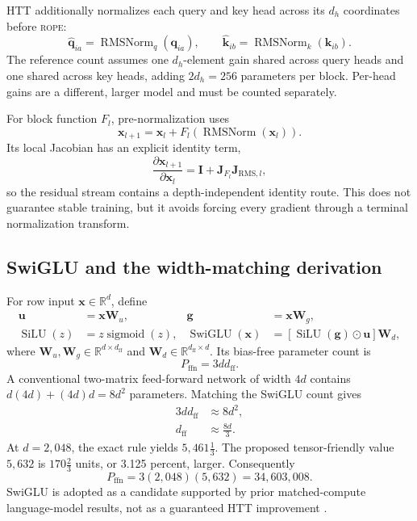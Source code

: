 \documentclass[10pt,letterpaper]{article}
\newcommand{\abbr}[1]{\textsc{\MakeLowercase{#1}}}
\newcommand{\R}{\mathbb{R}}
\newcommand{\1}{\mathbb{1}}
\newcommand{\vect}[1]{\bm{#1}}
\newcommand{\mat}[1]{\bm{#1}}
\newcommand{\sigmoid}{\operatorname{sigmoid}}
\begin{document}
HTT additionally normalizes each query and key head across its $d_h$ coordinates before \abbr{RoPE}:
\begin{equation}
  \widehat{\vect q}_{ia}=\operatorname{RMSNorm}_{q}(\vect q_{ia}),\qquad
  \widehat{\vect k}_{ib}=\operatorname{RMSNorm}_{k}(\vect k_{ib}).
  \label{eq:qknorm}
\end{equation}
The reference count assumes one $d_h$-element gain shared across query heads and one shared across
key heads, adding $2d_h=256$ parameters per block.  Per-head gains are a different, larger model and
must be counted separately.

For block function $F_l$, pre-normalization uses
\begin{equation}
  \vect x_{l+1}=\vect x_l+F_l(\operatorname{RMSNorm}(\vect x_l)).
  \label{eq:prenorm}
\end{equation}
Its local Jacobian has an explicit identity term,
\begin{equation}
  \frac{\partial\vect x_{l+1}}{\partial\vect x_l}
  =\mat I+\mat J_{F_l}\mat J_{\mathrm{RMS},l},
  \label{eq:prenorm-jacobian}
\end{equation}
so the residual stream contains a depth-independent identity route.  This does not guarantee stable
training, but it avoids forcing every gradient through a terminal normalization transform.

\subsection{SwiGLU and the width-matching derivation}

For row input $\vect x\in\R^d$, define
\begin{align}
  \vect u&=\vect x\mat W_u,&
  \vect g&=\vect x\mat W_g,\\
  \operatorname{SiLU}(z)&=z\sigmoid(z),&
  \operatorname{SwiGLU}(\vect x)
  &=\left[\operatorname{SiLU}(\vect g)\odot\vect u\right]\mat W_d,
  \label{eq:swiglu}
\end{align}
where $\mat W_u,\mat W_g\in\R^{d\times d_{\mathrm{ff}}}$ and
$\mat W_d\in\R^{d_{\mathrm{ff}}\times d}$.  Its bias-free parameter count is
\begin{equation}
  P_{\mathrm{ffn}}=3dd_{\mathrm{ff}}.
  \label{eq:ffn-params}
\end{equation}
A conventional two-matrix feed-forward network of width $4d$ contains
$d(4d)+(4d)d=8d^2$ parameters.  Matching the SwiGLU count gives
\begin{align}
  3dd_{\mathrm{ff}}&\approx8d^2,\\
  d_{\mathrm{ff}}&\approx\frac{8d}{3}.
  \label{eq:ffn-match}
\end{align}
At $d=2{,}048$, the exact rule yields $5{,}461\tfrac{1}{3}$.  The proposed tensor-friendly value
$5{,}632$ is $170\tfrac{2}{3}$ units, or 3.125 percent, larger.  Consequently
\begin{equation}
  P_{\mathrm{ffn}}=3(2{,}048)(5{,}632)=34{,}603{,}008.
  \label{eq:ffn-numeric}
\end{equation}
SwiGLU is adopted as a candidate supported by prior matched-compute language-model results, not as a
guaranteed HTT improvement \cite{shazeer2020glu}.
\end{document}
